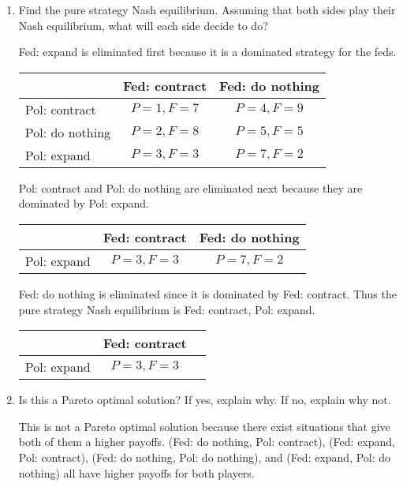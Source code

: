 \documentclass{math}
\begin{document}
\begin{enumerate}
  \item Find the pure strategy Nash equilibrium. Assuming that both sides play
  their Nash equilibrium, what will each side decide to do?
  \par Fed: expand is eliminated first because it is a dominated strategy for
  the feds.
  \begin{center}
    \begin{tabular}[h!]{|l||c|c|}
      \hline
      & Fed: contract  & Fed: do nothing \\ \hline \hline
      Pol: contract & \( P=1, F=7 \) & \( P=4, F=9 \) \\ \hline
      Pol: do nothing & \( P=2, F=8 \) & \( P=5, F=5 \) \\ \hline
      Pol: expand & \( P=3, F=3 \) & \( P=7, F=2 \) \\ \hline
    \end{tabular}
  \end{center}
  Pol: contract and Pol: do nothing are eliminated next because they are
  dominated by Pol: expand.
  \begin{center}
    \begin{tabular}[h!]{|l||c|c|}
      \hline
      & Fed: contract  & Fed: do nothing \\ \hline \hline
      Pol: expand & \( P=3, F=3 \) & \( P=7, F=2 \) \\ \hline
    \end{tabular}
  \end{center}
  Fed: do nothing is eliminated since it is dominated by Fed: contract. Thus
  the pure strategy Nash equilibrium is Fed: contract, Pol: expand.
  \begin{center}
    \begin{tabular}[h!]{|l||c|c|}
      \hline
      & Fed: contract \\ \hline \hline
      Pol: expand & \( P=3, F=3 \) \\ \hline
    \end{tabular}
  \end{center}
  \item Is this a Pareto optimal solution? If yes, explain why. If no, explain
  why not.
  \par This is not a Pareto optimal solution because there exist situations
  that give both of them a higher payoffs. (Fed: do nothing, Pol: contract),
  (Fed: expand, Pol: contract), (Fed: do nothing, Pol: do nothing), and
  (Fed: expand, Pol: do nothing) all have higher payoffs for both players.
\end{enumerate}
\end{document}
